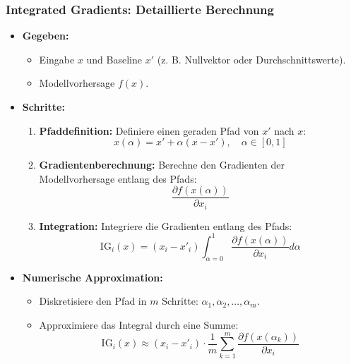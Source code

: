 \documentclass[aspectratio=1610, xcolor=dvipsnames, 9pt]{beamer}
\begin{document}
\begin{frame}
  \frametitle{Integrated Gradients: Detaillierte Berechnung}
  \begin{itemize}
    \item \textbf{Gegeben:}
    \begin{itemize}
      \item Eingabe $x$ und Baseline $x'$ (z. B. Nullvektor oder Durchschnittswerte).
      \item Modellvorhersage $f(x)$.
    \end{itemize}
    \item \textbf{Schritte:}
    \begin{enumerate}
      \item \textbf{Pfaddefinition:} Definiere einen geraden Pfad von $x'$ nach $x$:
      \[
      x(\alpha) = x' + \alpha (x - x'), \quad \alpha \in [0, 1]
      \]
      \item \textbf{Gradientenberechnung:} Berechne den Gradienten der Modellvorhersage entlang des Pfads:
      \[
      \frac{\partial f(x(\alpha))}{\partial x_i}
      \]
      \item \textbf{Integration:} Integriere die Gradienten entlang des Pfads:
      \[
      \text{IG}_i(x) = (x_i - x'_i) \int_{\alpha=0}^1 \frac{\partial f(x(\alpha))}{\partial x_i} d\alpha
      \]
    \end{enumerate}
    \item \textbf{Numerische Approximation:}
    \begin{itemize}
      \item Diskretisiere den Pfad in $m$ Schritte: $\alpha_1, \alpha_2, \dots, \alpha_m$.
      \item Approximiere das Integral durch eine Summe:
      \[
      \text{IG}_i(x) \approx (x_i - x'_i) \cdot \frac{1}{m} \sum_{k=1}^m \frac{\partial f(x(\alpha_k))}{\partial x_i}
      \]
    \end{itemize}
  \end{itemize}
\end{frame}
\end{document}
